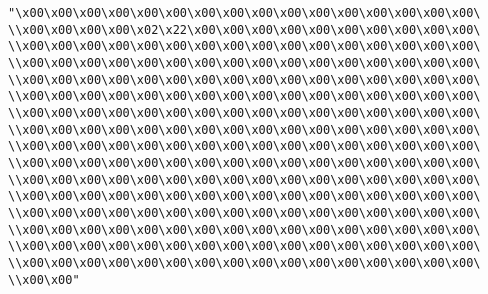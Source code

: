 \verb|"\x00\x00\x00\x00\x00\x00\x00\x00\x00\x00\x00\x00\x00\x00\x00\x00\|\newline
\verb|\\x00\x00\x00\x00\x02\x22\x00\x00\x00\x00\x00\x00\x00\x00\x00\x00\|\newline
\verb|\\x00\x00\x00\x00\x00\x00\x00\x00\x00\x00\x00\x00\x00\x00\x00\x00\|\newline
\verb|\\x00\x00\x00\x00\x00\x00\x00\x00\x00\x00\x00\x00\x00\x00\x00\x00\|\newline
\verb|\\x00\x00\x00\x00\x00\x00\x00\x00\x00\x00\x00\x00\x00\x00\x00\x00\|\newline
\verb|\\x00\x00\x00\x00\x00\x00\x00\x00\x00\x00\x00\x00\x00\x00\x00\x00\|\newline
\verb|\\x00\x00\x00\x00\x00\x00\x00\x00\x00\x00\x00\x00\x00\x00\x00\x00\|\newline
\verb|\\x00\x00\x00\x00\x00\x00\x00\x00\x00\x00\x00\x00\x00\x00\x00\x00\|\newline
\verb|\\x00\x00\x00\x00\x00\x00\x00\x00\x00\x00\x00\x00\x00\x00\x00\x00\|\newline
\verb|\\x00\x00\x00\x00\x00\x00\x00\x00\x00\x00\x00\x00\x00\x00\x00\x00\|\newline
\verb|\\x00\x00\x00\x00\x00\x00\x00\x00\x00\x00\x00\x00\x00\x00\x00\x00\|\newline
\verb|\\x00\x00\x00\x00\x00\x00\x00\x00\x00\x00\x00\x00\x00\x00\x00\x00\|\newline
\verb|\\x00\x00\x00\x00\x00\x00\x00\x00\x00\x00\x00\x00\x00\x00\x00\x00\|\newline
\verb|\\x00\x00\x00\x00\x00\x00\x00\x00\x00\x00\x00\x00\x00\x00\x00\x00\|\newline
\verb|\\x00\x00\x00\x00\x00\x00\x00\x00\x00\x00\x00\x00\x00\x00\x00\x00\|\newline
\verb|\\x00\x00\x00\x00\x00\x00\x00\x00\x00\x00\x00\x00\x00\x00\x00\x00\|\newline
\verb|\\x00\x00"|\newline
